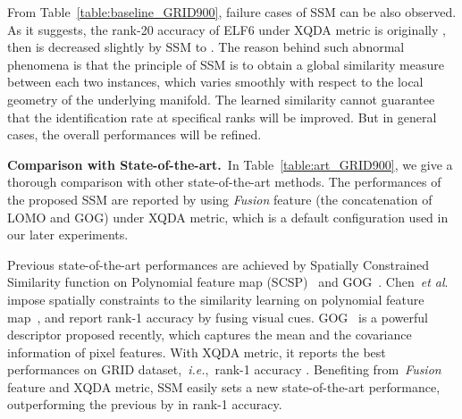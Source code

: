 \documentclass[10pt,twocolumn,letterpaper]{article}
\def\etal{\emph{et al}.}
\def\ie{\emph{i.e.}}
\begin{document}
From Table~\ref{table:baseline_GRID900}, failure cases of SSM can be also observed. As it suggests, the rank-20 accuracy of ELF6 under XQDA metric is originally , then is decreased slightly by SSM to . The  reason behind such abnormal phenomena is that the principle of SSM is to obtain a global similarity measure between each two instances, which varies smoothly with respect to the local geometry of the underlying manifold. The learned similarity cannot guarantee that the identification rate at specifical ranks will be improved. But in general cases, the overall performances will be refined.

\vspace{1ex}\noindent\textbf{Comparison with State-of-the-art.}~In Table~\ref{table:art_GRID900}, we give a thorough comparison with other state-of-the-art methods.
The performances of the proposed SSM are reported by using \emph{Fusion} feature (the concatenation of LOMO and GOG) under XQDA metric, which is a default configuration used in our later experiments.

Previous state-of-the-art performances are achieved by Spatially Constrained Similarity function on Polynomial feature map (SCSP)~\cite{SCSP} and GOG~\cite{GOG}. Chen~\etal~\cite{SCSP} impose spatially constraints to the similarity learning on polynomial feature map~\cite{PolyMap}, and report rank-1 accuracy  by fusing  visual cues. GOG~\cite{GOG} is a powerful descriptor proposed recently, which captures the mean and the covariance information of pixel features. With XQDA metric, it reports the best performances on GRID dataset,~\ie,~rank-1 accuracy . Benefiting from~\emph{Fusion} feature and XQDA metric, SSM easily sets a new state-of-the-art performance, outperforming the previous by  in rank-1 accuracy.
\end{document}
